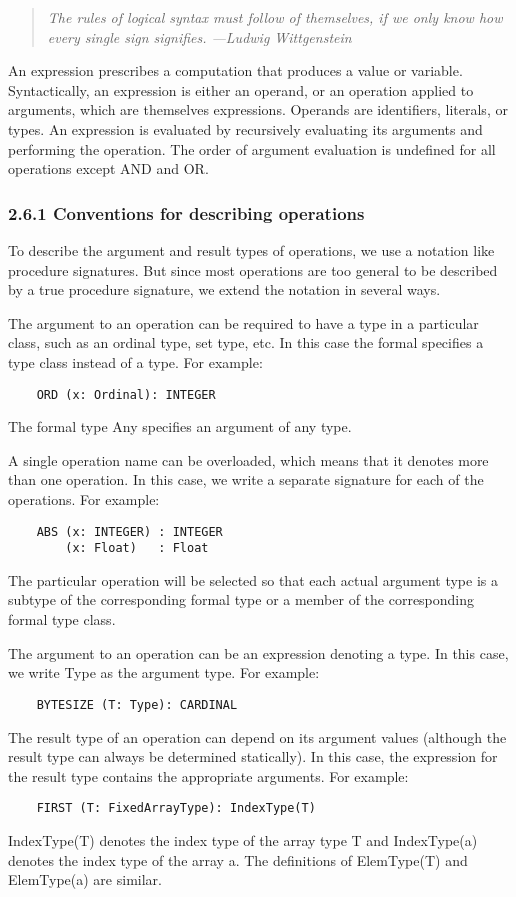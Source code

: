 \documentclass[10pt]{article}
\begin{document}
 
\begin{quote}
\emph{ The rules of logical syntax must follow of themselves, if we only know how every single sign signifies. ---Ludwig Wittgenstein }
\end{quote}



 An expression prescribes a computation that produces a value or variable. Syntactically, an expression is either an operand, or an operation applied to arguments, which are themselves expressions. Operands are identifiers, literals, or types. An expression is evaluated by recursively evaluating its arguments and performing the operation. The order of argument evaluation is undefined for all operations except AND and OR. 


 
\subsubsection*{2.6.1 Conventions for describing operations}


  To describe the argument and result types of operations, we use a notation like procedure signatures. But since most operations are too general to be described by a true procedure signature, we extend the notation in several ways. 


  The argument to an operation can be required to have a type in a particular class, such as an ordinal type, set type, etc. In this case the formal specifies a type class instead of a type. For example: 
\begin{verbatim}
    ORD (x: Ordinal): INTEGER
\end{verbatim}
 The formal type Any specifies an argument of any type. 


 A single operation name can be overloaded, which means that it denotes more than one operation. In this case, we write a separate signature for each of the operations. For example: 
\begin{verbatim}
    ABS (x: INTEGER) : INTEGER
        (x: Float)   : Float
\end{verbatim}
 The particular operation will be selected so that each actual argument type is a subtype of the corresponding formal type or a member of the corresponding formal type class. 


  The argument to an operation can be an expression denoting a type. In this case, we write Type as the argument type. For example: 
\begin{verbatim}
    BYTESIZE (T: Type): CARDINAL
\end{verbatim}
 The result type of an operation can depend on its argument values (although the result type can always be determined statically). In this case, the expression for the result type contains the appropriate arguments. For example: 
\begin{verbatim}
    FIRST (T: FixedArrayType): IndexType(T)
\end{verbatim}
 IndexType(T) denotes the index type of the array type  T and IndexType(a) denotes the index type of the array  a. The definitions of ElemType(T) and ElemType(a) are similar. 
\end{document}
